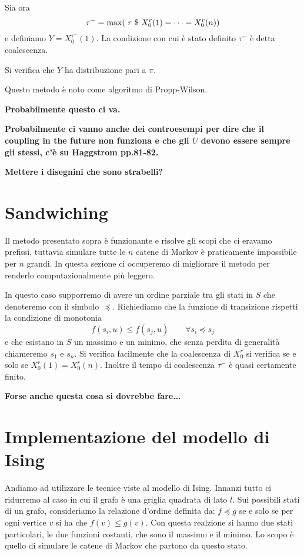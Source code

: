 \documentclass[]{marticle}
\begin{document}
Sia ora 
\[
    \tau^-=\max(\ r \ \$\  X^r_0(1) = \dots = X^r_0(n))
\]
e definiamo $Y = X^{\tau^-}_0(1)$. La condizione con cui \`e stato definito $\tau^-$
\`e detta coalescenza.

Si verifica che $Y$ ha distribuzione pari a $\pi$.

Questo metodo \`e noto come algoritmo di Propp-Wilson.

\textbf{Probabilmente questo ci va.}

\textbf{Probabilmente ci vanno anche dei controesempi per dire che il coupling
in the future non funziona e che gli $U$ devono essere sempre gli stessi, c'\`e
su Haggstrom pp.81-82.}

\textbf{Mettere i disegnini che sono strabelli?}
\section{Sandwiching}

Il metodo presentato sopra \`e funzionante e risolve gli scopi che ci eravamo
prefissi, tuttavia simulare tutte le $n$ catene di Markov \`e praticamente
impossibile per $n$ grandi. In questa sezione ci occuperemo di migliorare il
metodo per renderlo computazionalmente pi\`u leggero.
 
In questo caso supporremo di avere un ordine parziale tra gli stati in $S$ che
denoteremo con il simbolo $\preceq$. Richiediamo che la funzione di transizione
rispetti la condizione di monotonia
\[
    f(s_i, u) \leq f(s_j, u) \qquad \forall s_i \preceq s_j
\]
e che esistano in $S$ un massimo e un minimo, che senza perdita di generalit\`a
chiameremo $s_1$ e $s_n$. Si verifica facilmente che la coalescenza di $X^r_0$
si verifica se e solo se $X^r_0(1) = X^r_0(n)$. Inoltre il tempo di coalescenza
$\tau^-$ \`e quasi certamente finito. 

\textbf{Forse anche questa cosa si dovrebbe fare...}

\section{Implementazione del modello di Ising}

Andiamo ad utilizzare le tecnice viste al modello di Ising. Innanzi tutto ci
ridurremo al caso in cui il grafo \`e una griglia quadrata di lato $l$. Sui
possibili stati di un grafo, consideriamo la relazione d'ordine definita da:
$f \preceq g$ se e solo se per ogni vertice $v$ si ha che $f(v) \leq g(v)$.
Con questa realzione si hanno due stati particolari, le due funzioni costanti,
che sono il massimo e il minimo. Lo scopo \`e quello di simulare le catene di
Markov che partono da questo stato. 
\end{document}
